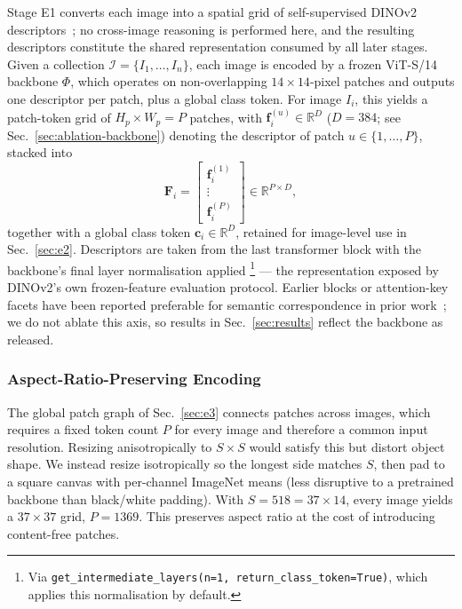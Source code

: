 Stage E1 converts each image into a spatial grid of self-supervised
DINOv2 descriptors~\cite{oquab2024dinov2}; no cross-image reasoning is
performed here, and the resulting descriptors constitute the shared
representation consumed by all later stages. Given a collection
$\mathcal{I}=\{I_1,\dots,I_n\}$, each image is encoded by a frozen
ViT-S/14 backbone $\Phi$, which operates on non-overlapping
$14\times14$-pixel patches and outputs one descriptor per patch, plus a
global class token. For image $I_i$, this yields a patch-token grid of
$H_p \times W_p = P$ patches, with $\mathbf{f}_i^{(u)} \in
\mathbb{R}^D$ ($D=384$; see Sec.~\ref{sec:ablation-backbone}) denoting
the descriptor of patch $u \in \{1,\dots,P\}$, stacked into
\begin{equation}
\mathbf{F}_i =
\begin{bmatrix} \mathbf{f}_i^{(1)} \\ \vdots \\ \mathbf{f}_i^{(P)} \end{bmatrix}
\in \mathbb{R}^{P \times D},
\end{equation}
together with a global class token $\mathbf{c}_i \in \mathbb{R}^D$,
retained for image-level use in Sec.~\ref{sec:e2}. Descriptors are taken
from the last transformer block with the backbone's final layer
normalisation applied
\footnote{Via \texttt{get\_intermediate\_layers(n=1,
return\_class\_token=True)}, which applies this normalisation by
default.} — the representation exposed by DINOv2's own frozen-feature
evaluation protocol. Earlier blocks or attention-key facets have been
reported preferable for semantic correspondence in prior
work~\cite{amir2023effectiveness}; we do not ablate this axis, so results
in Sec.~\ref{sec:results} reflect the backbone as released.

\subsubsection{Aspect-Ratio-Preserving Encoding}

The global patch graph of Sec.~\ref{sec:e3} connects patches across
images, which requires a fixed token count $P$ for every image and
therefore a common input resolution. Resizing anisotropically to
$S\times S$ would satisfy this but distort object shape. We instead
resize isotropically so the longest side matches $S$, then pad to a
square canvas with per-channel ImageNet means (less disruptive to a
pretrained backbone than black/white padding). With $S=518=37\times 14$,
every image yields a $37\times 37$ grid, $P=1369$. This preserves aspect
ratio at the cost of introducing content-free patches.

